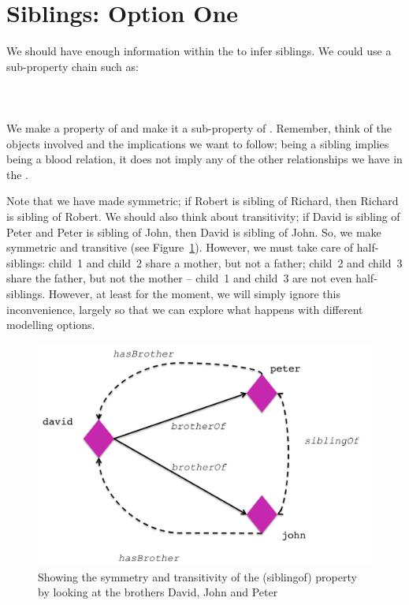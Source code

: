 \section{Siblings: Option One}
\label{sec:sib1}
We should have enough information within the \fhkb to infer siblings. We could use a sub-property chain such as:
\\\\
\\\\
We make a property of  and make it a sub-property of . Remember, think of the objects involved and the implications we want to follow; being a sibling implies being a blood relation, it does not imply any of the other relationships we have in the \fhkb. 

Note that we have made  symmetric; if Robert is sibling of Richard, then Richard is sibling of Robert. We should also think about transitivity; if David is sibling of Peter and Peter is sibling of John, then David is sibling of John. So, we make  symmetric and transitive (see Figure~\ref{fig:sib_trans}).{\herebedragons} However, we must take care of half-siblings: child~1 and child~2 share a mother, but not a father; child~2 and child~3 share the father, but not the mother -- child~1 and child~3 are not even half-siblings. However, at least for the moment, we will simply ignore this inconvenience, largely so that we can explore what happens with different modelling options.

\begin{figure}
\begin{center}
\includegraphics[width=\figwidth]{figures/siblings}\caption{Showing the symmetry and transitivity of the  (siblingof) property by looking at the brothers David, John and Peter}\label{fig:sib_trans}
\end{center}
\end{figure}

